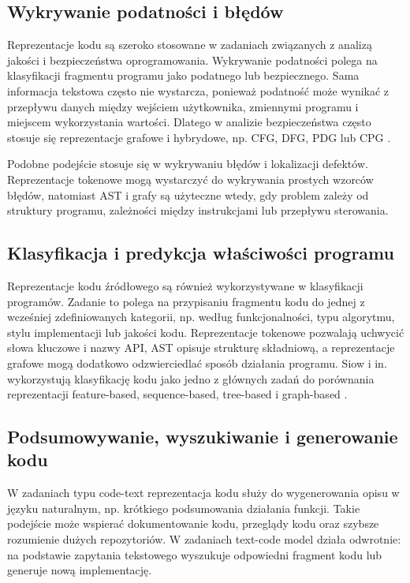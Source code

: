 \documentclass[conference]{IEEEtran}
\begin{document}
\subsection{Wykrywanie podatności i błędów}

Reprezentacje kodu są szeroko stosowane w zadaniach związanych z analizą jakości i bezpieczeństwa oprogramowania. Wykrywanie podatności polega na klasyfikacji fragmentu programu jako podatnego lub bezpiecznego. Sama informacja tekstowa często nie wystarcza, ponieważ podatność może wynikać z przepływu danych między wejściem użytkownika, zmiennymi programu i miejscem wykorzystania wartości. Dlatego w analizie bezpieczeństwa często stosuje się reprezentacje grafowe i hybrydowe, np. CFG, DFG, PDG lub CPG \cite{b6}.

Podobne podejście stosuje się w wykrywaniu błędów i lokalizacji defektów. Reprezentacje tokenowe mogą wystarczyć do wykrywania prostych wzorców błędów, natomiast AST i grafy są użyteczne wtedy, gdy problem zależy od struktury programu, zależności między instrukcjami lub przepływu sterowania.

\subsection{Klasyfikacja i predykcja właściwości programu}

Reprezentacje kodu źródłowego są również wykorzystywane w klasyfikacji programów. Zadanie to polega na przypisaniu fragmentu kodu do jednej z wcześniej zdefiniowanych kategorii, np. według funkcjonalności, typu algorytmu, stylu implementacji lub jakości kodu. Reprezentacje tokenowe pozwalają uchwycić słowa kluczowe i nazwy API, AST opisuje strukturę składniową, a reprezentacje grafowe mogą dodatkowo odzwierciedlać sposób działania programu. Siow i in. wykorzystują klasyfikację kodu jako jedno z głównych zadań do porównania reprezentacji feature-based, sequence-based, tree-based i graph-based \cite{b3}.

\subsection{Podsumowywanie, wyszukiwanie i generowanie kodu}

W zadaniach typu code-text reprezentacja kodu służy do wygenerowania opisu w języku naturalnym, np. krótkiego podsumowania działania funkcji. Takie podejście może wspierać dokumentowanie kodu, przeglądy kodu oraz szybsze rozumienie dużych repozytoriów. W zadaniach text-code model działa odwrotnie: na podstawie zapytania tekstowego wyszukuje odpowiedni fragment kodu lub generuje nową implementację.
\end{document}
